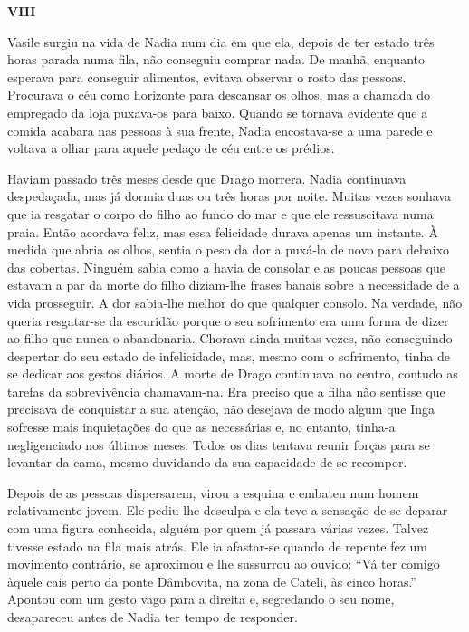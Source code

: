 \pagebreak
\vspace*{1.8cm}
\noindent{}\textbf{VIII}

\bigskip

Vasile surgiu na vida de Nadia num dia em que ela, depois de ter estado
três horas parada numa fila, não conseguiu comprar nada. De manhã,
enquanto esperava para conseguir alimentos, evitava observar o rosto das
pessoas. Procurava o céu como horizonte para descansar os olhos, mas a
chamada do empregado da loja puxava-os para baixo. Quando se tornava
evidente que a comida acabara nas pessoas à sua frente, Nadia
encostava-se a uma parede e voltava a olhar para aquele pedaço de céu
entre os prédios.

Haviam passado três meses desde que Drago morrera. Nadia continuava
despedaçada, mas já dormia duas ou três horas por noite. Muitas vezes
sonhava que ia resgatar o corpo do filho ao fundo do mar e que ele
ressuscitava numa praia. Então acordava feliz, mas essa felicidade
durava apenas um instante. À medida que abria os olhos, sentia o peso da
dor a puxá-la de novo para debaixo das cobertas. Ninguém sabia como a
havia de consolar e as poucas pessoas que estavam a par da morte do
filho diziam-lhe frases banais sobre a necessidade de a vida
prosseguir. A dor sabia-lhe melhor do que qualquer consolo. Na
verdade, não queria resgatar-se da escuridão porque o seu sofrimento era
uma forma de dizer ao filho que nunca o abandonaria. Chorava ainda
muitas vezes, não conseguindo despertar do seu estado de infelicidade,
mas, mesmo com o sofrimento, tinha de se dedicar aos gestos diários. A
morte de Drago continuava no centro, contudo as tarefas da sobrevivência
chamavam-na. Era preciso que a filha não sentisse que precisava de
conquistar a sua atenção, não desejava de modo algum que Inga sofresse
mais inquietações do que as necessárias e, no entanto, tinha-a
negligenciado nos últimos meses. Todos os dias tentava reunir forças
para se levantar da cama, mesmo duvidando da sua capacidade de se
recompor.

Depois de as pessoas dispersarem, virou a esquina e
embateu num homem relativamente jovem. Ele pediu-lhe desculpa e ela teve
a sensação de se deparar com uma figura conhecida, alguém por quem já
passara várias vezes. Talvez tivesse estado na fila mais atrás. Ele ia
afastar-se quando de repente fez um movimento contrário, se aproximou
e lhe sussurrou ao ouvido: ``Vá ter comigo àquele cais perto da ponte
Dâmbovita, na zona de Cateli, às cinco horas.'' Apontou com um gesto vago
para a direita e, segredando o seu nome, desapareceu antes de Nadia ter
tempo de responder.

